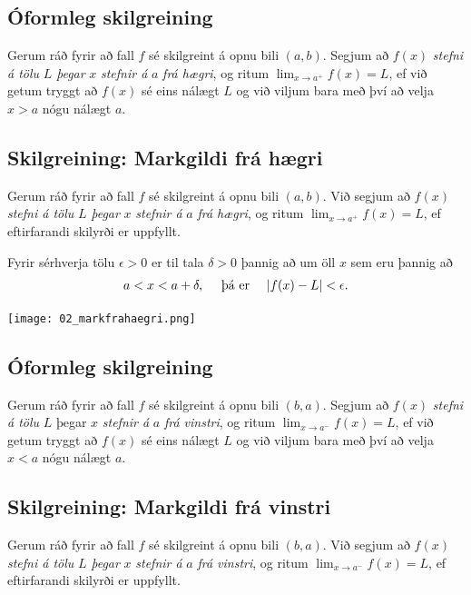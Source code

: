 \documentclass[a4paper,10pt,icelandic]{sphinxmanual}
\begin{document}
\subsection{Óformleg skilgreining}
\label{kafli02:index-1}\label{kafli02:oformleg-skilgreining}
Gerum ráð fyrir að fall \(f\) sé skilgreint á opnu bili
\((a,b)\). Segjum að \(f(x)\) \emph{stefni á tölu} \(L\) \emph{þegar}
\(x\) \emph{stefnir á} \(a\) \emph{frá hægri}, og ritum
\(\lim_{x\rightarrow a^+} f(x)=L\), ef við getum tryggt að
\(f(x)\) sé eins nálægt \(L\) og við viljum bara með því að
velja \(x>a\) nógu nálægt \(a\).


\subsection{Skilgreining: Markgildi frá hægri}
\label{kafli02:skilgreining-markgildi-fra-haegri}
Gerum ráð fyrir að fall \(f\) sé skilgreint á opnu bili
\((a,b)\). Við segjum að \(f(x)\) \emph{stefni á tölu} \(L\)
\emph{þegar} \(x\) \emph{stefnir á} \(a\) \emph{frá hægri}, og ritum
\(\lim_{x\rightarrow a^+} f(x)=L\), ef eftirfarandi skilyrði er
uppfyllt.

Fyrir sérhverja tölu \(\epsilon>0\) er til tala \(\delta>0\)
þannig að um öll \(x\) sem eru þannig að
\begin{gather}
\begin{split}a<x<a+\delta,\quad \text{ þá er } \quad |f(x)-L| <\epsilon.\end{split}\notag
\end{gather}

\begin{center}
\texttt{[image: 02\_markfrahaegri.png]}
\end{center}



\subsection{Óformleg skilgreining}
\label{kafli02:index-2}\label{kafli02:id2}
Gerum ráð fyrir að fall \(f\) sé skilgreint á opnu bili
\((b,a)\). Segjum að \(f(x)\) \emph{stefni á tölu} \(L\) þegar
\(x\) \emph{stefnir á} \(a\) \emph{frá vinstri}, og ritum
\(\lim_{x\rightarrow a^-} f(x)=L\), ef við getum tryggt að
\(f(x)\) sé eins nálægt \(L\) og við viljum bara með því að
velja \(x<a\) nógu nálægt \(a\).


\subsection{Skilgreining: Markgildi frá vinstri}
\label{kafli02:skilgreining-markgildi-fra-vinstri}
Gerum ráð fyrir að fall \(f\) sé skilgreint á opnu bili
\((b,a)\). Við segjum að \(f(x)\) \emph{stefni á tölu} \(L\)
\emph{þegar} \(x\) \emph{stefnir á} \(a\) \emph{frá vinstri}, og ritum
\(\lim_{x\rightarrow a^-} f(x)=L\), ef eftirfarandi skilyrði er
uppfyllt.
\end{document}
